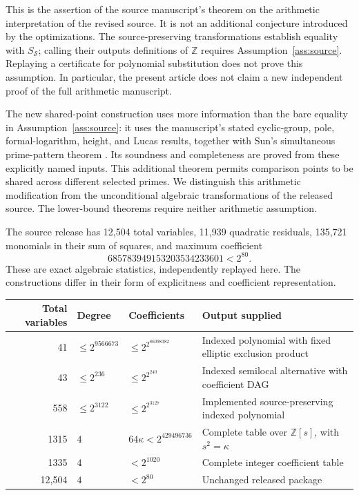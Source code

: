 \documentclass[11pt]{article}
\theoremstyle{definition}
\newcommand{\Z}{\mathbb Z}
\newcommand{\Src}{\mathcal S}
\begin{document}
This is the assertion of the source manuscript's theorem on the
arithmetic interpretation of the revised source. It is not an additional
conjecture introduced by the optimizations. The source-preserving transformations
establish equality with $S_{\Src}$; calling their outputs definitions
of $\Z$ requires Assumption~\ref{ass:source}. Replaying a certificate
for polynomial substitution does not prove this assumption. In
particular, the present article does not claim a new independent proof
of the full arithmetic manuscript.

The new shared-point construction uses more information than the bare
equality in Assumption~\ref{ass:source}: it uses the manuscript's stated
cyclic-group, pole, formal-logarithm, height, and Lucas results, together
with Sun's simultaneous prime-pattern theorem
\cite[Theorem~4.1]{Sun2026Rational86}. Its soundness and completeness
are proved from these explicitly named inputs. This additional theorem
permits comparison points to be shared across different selected primes.
We distinguish this arithmetic modification from the unconditional
algebraic transformations of the released source. The lower-bound
theorems require neither arithmetic assumption.

The source release has 12,504 total variables, 11,939 quadratic
residuals, 135,721 monomials in their sum of squares, and maximum
coefficient
\[
 685783949153203534233601<2^{80}.
\]
These are exact algebraic statistics, independently replayed here.
The constructions differ in their form of explicitness and coefficient representation.

\begin{center}
\small
\begin{tabular}{r l l p{43mm}}
\toprule
Total variables & Degree & Coefficients & Output supplied\\
\midrule
41 & $\le2^{9566673}$ & $\le2^{2^{86098382}}$ & Indexed polynomial with fixed elliptic exclusion product\\
43 & $\le2^{236}$ & $\le2^{2^{240}}$ & Indexed semilocal alternative with coefficient DAG\\
558 & $\le2^{3122}$ & $\le2^{2^{3127}}$ & Implemented source-preserving indexed polynomial\\
1315 & $4$ & $64\kappa<2^{429496736}$ & Complete table over $\mathbb Z[s]$, with $s^2=\kappa$\\
1335 & $4$ & $<2^{1020}$ & Complete integer coefficient table\\
12,504 & $4$ & $<2^{80}$ & Unchanged released package\\
\bottomrule
\end{tabular}
\end{center}
\end{document}
